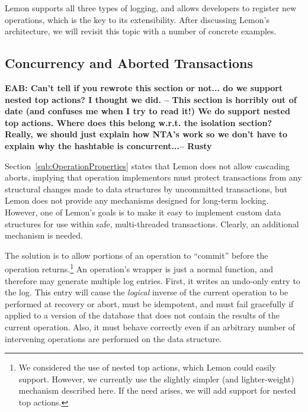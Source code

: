 \documentclass[letterpaper,twocolumn,english]{article}
\newcommand{\yad}{Lemon\xspace}
\newcommand{\eab}[1]{{\bf EAB: #1}}
\begin{document}
\yad supports all three types of logging, and allows developers to
register new operations, which is the key to its extensibility. After
discussing \yad's architecture, we will revisit this topic with a number of
concrete examples.


\subsection{Concurrency and Aborted Transactions}
\label{nested-top-actions}

\eab{Can't tell if you rewrote this section or not...  do we support nested top actions?  I thought we did. -- This section is horribly out of date (and confuses me when I try to read it!)  We do support nested top actions. Where does this belong w.r.t. the isolation section? Really, we should just explain how NTA's work so we don't have to explain why the hashtable is concurrent...-- Rusty}


Section~\ref{sub:OperationProperties} states that \yad does not
allow cascading aborts, implying that operation implementors must
protect transactions from any structural changes made to data structures
by uncommitted transactions, but \yad does not provide any mechanisms
designed for long-term locking. However, one of \yad's goals is to
make it easy to implement custom data structures for use within safe,
multi-threaded transactions. Clearly, an additional mechanism is needed.

The solution is to allow portions of an operation to ``commit'' before
the operation returns.\footnote{We considered the use of nested top actions, which \yad could easily
support. However, we currently use the slightly simpler (and lighter-weight)
mechanism described here. If the need arises, we will add support
for nested top actions.}
An operation's wrapper is just a normal function, and therefore may
generate multiple log entries. First, it writes an undo-only entry
to the log. This entry will cause the \emph{logical} inverse of the
current operation to be performed at recovery or abort, must be idempotent,
and must fail gracefully if applied to a version of the database that
does not contain the results of the current operation. Also, it must
behave correctly even if an arbitrary number of intervening operations
are performed on the data structure.
\end{document}
